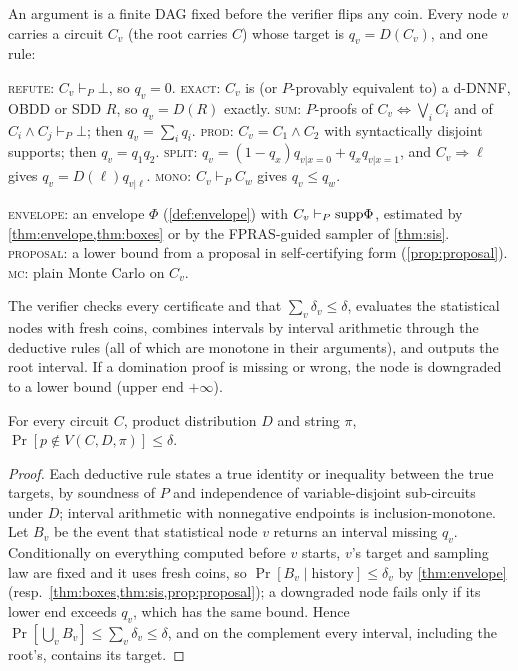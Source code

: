 \begin{definition}\label{def:pcis}
An argument is a finite DAG fixed before the verifier flips any coin. Every node
$v$ carries a circuit $C_v$ (the root carries $C$) whose target is
$q_v=D(C_v)$, and one rule:
\begin{description}[style=nextline,leftmargin=1.2em]
\item[Deductive rules (checked by the verifier, no randomness).]
\textsc{refute}: $C_v\vdash_P\bot$, so $q_v=0$.
\textsc{exact}: $C_v$ is (or $P$-provably equivalent to) a d-DNNF, OBDD or
SDD $R$, so $q_v=D(R)$ exactly.
\textsc{sum}: $P$-proofs of $C_v\Leftrightarrow\bigvee_iC_i$ and of
$C_i\wedge C_j\vdash_P\bot$; then $q_v=\sum_iq_i$.
\textsc{prod}: $C_v=C_1\wedge C_2$ with syntactically disjoint supports; then
$q_v=q_1q_2$.
\textsc{split}: $q_v=(1-q_x)q_{v|x=0}+q_xq_{v|x=1}$, and $C_v\Rightarrow\ell$
gives $q_v=D(\ell)q_{v|\ell}$.
\textsc{mono}: $C_v\vdash_PC_w$ gives $q_v\le q_w$.
\item[Statistical rules (each with a confidence budget $\delta_v$ and a sample
size written in the argument).]
\textsc{envelope}: an envelope $\Phi$ (\cref{def:envelope}) with
$C_v\vdash_P\mathrm{supp}\Phi$, estimated by \cref{thm:envelope,thm:boxes} or by the
FPRAS-guided sampler of \cref{thm:sis}.
\textsc{proposal}: a lower bound from a proposal in self-certifying form
(\cref{prop:proposal}).
\textsc{mc}: plain Monte Carlo on $C_v$.
\end{description}
The verifier checks every certificate and that $\sum_v\delta_v\le\delta$,
evaluates the statistical nodes with fresh coins, combines intervals by
interval arithmetic through the deductive rules (all of which are monotone
in their arguments), and outputs the root interval. If a domination proof
is missing or wrong, the node is downgraded to a lower bound (upper end
$+\infty$).
\end{definition}

\begin{theorem}[soundness]\label{thm:pcis-sound}
For every circuit $C$, product distribution $D$ and string $\pi$,
$\Pr[p\notin V(C,D,\pi)]\le\delta$.
\end{theorem}

\begin{proof}
Each deductive rule states a true identity or inequality between the true
targets, by soundness of $P$ and independence of variable-disjoint
sub-circuits under $D$; interval arithmetic with nonnegative endpoints is
inclusion-monotone. Let $B_v$ be the event that statistical node $v$ returns
an interval missing $q_v$. Conditionally on everything computed before $v$
starts, $v$'s target and sampling law are fixed and it uses fresh coins, so
$\Pr[B_v\mid\text{history}]\le\delta_v$ by \cref{thm:envelope} (resp.\
\cref{thm:boxes,thm:sis,prop:proposal}); a downgraded node fails only if its
lower end exceeds $q_v$, which has the same bound. Hence
$\Pr[\bigcup_vB_v]\le\sum_v\delta_v\le\delta$, and on the complement every
interval, including the root's, contains its target.
\end{proof}

